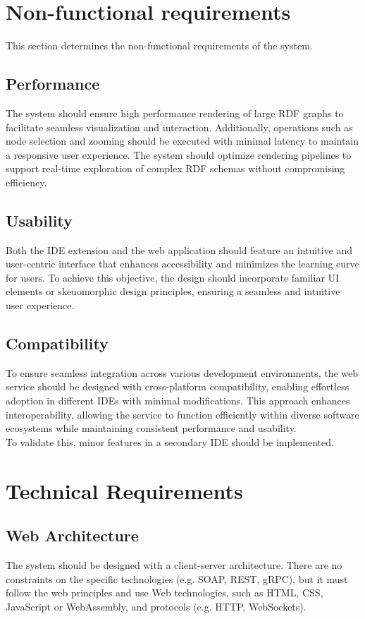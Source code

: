 \section{Non-functional requirements\label{sec:techreq}}
This section determines the non-functional requirements of the system.

\subsection{Performance\label{sec:reqsuba}}
The system should ensure high performance rendering of large RDF graphs to facilitate seamless visualization and interaction. Additionally, operations such as node selection and zooming should be executed with minimal latency to maintain a responsive user experience. The system should optimize rendering pipelines to support real-time exploration of complex RDF schemas without compromising efficiency.

\subsection{Usability\label{sec:reqsuba}}
Both the IDE extension and the web application should feature an intuitive and user-centric interface that enhances accessibility and minimizes the learning curve for users. To achieve this objective, the design should incorporate familiar UI elements or skeuomorphic design principles, ensuring a seamless and intuitive user experience. 

\subsection{Compatibility\label{sec:reqsuba}}
To ensure seamless integration across various development environments, the web service should be designed with cross-platform compatibility, enabling effortless adoption in different IDEs with minimal modifications. This approach enhances interoperability, allowing the service to function efficiently within diverse software ecosystems while maintaining consistent performance and usability. 
\\
To validate this, minor features in a secondary IDE should be implemented.


\section{Technical Requirements\label{sec:techreq}}

\subsection{Web Architecture\label{sec:reqsuba}}
The system should be designed with a client-server architecture. There are no constraints on the specific technologies (e.g. SOAP, REST, gRPC), but it must follow the web principles and use Web technologies, such as HTML, CSS, JavaScript or WebAssembly, and protocols (e.g. HTTP, WebSockets).

